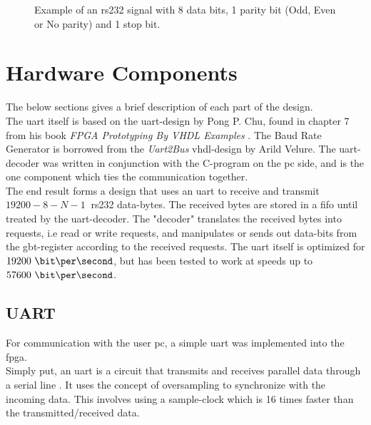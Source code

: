 \documentclass[main.tex]{subfiles}
\begin{document}
\begin{figure}[!h]
\begin{center}

\caption{Example of an \acrshort{rs232} signal with 8 data bits, 1 parity bit (Odd, Even or No parity) and 1 stop bit.}
\label{fig:rs232}

\end{center}
\end{figure}

\section{Hardware Components}

The below sections gives a brief description of each part of the design.\\
The \gls{uart} itself is based on the \gls{uart}-design by Pong P. Chu, found in chapter 7 from his book \textit{FPGA Prototyping By VHDL Examples} \cite{chu08}. The Baud Rate Generator is borrowed from the \textit{Uart2Bus} \acrshort{vhdl}-design by Arild Velure. The \gls{uart}-decoder was written in conjunction with the C-program on the \acrshort{pc} side, and is the one component which ties the communication together.\\

The end result forms a design that uses an \gls{uart} to receive and transmit $19200-8-N-1~$ \acrshort{rs232} data-bytes. The received bytes are stored in a \gls{fifo} until treated by the \gls{uart}-decoder. The "decoder" translates the received bytes into requests, i.e read or write requests, and manipulates or sends out data-bits from the \gls{gbt}-register according to the received requests. The \gls{uart} itself is optimized for $19200~\bit\per\second$, but has been tested to work at speeds up to $57600~\bit\per\second$.

\subsection{UART}
For communication with the user \acrshort{pc}, a simple \gls{uart} was implemented into the \gls{fpga}.\\
Simply put, an \gls{uart} is a circuit that transmits and receives parallel data through a serial line \cite{chu08}. It uses the concept of oversampling to synchronize with the incoming data. This involves using a sample-clock which is 16 times faster than the transmitted/received data.\\
\end{document}
